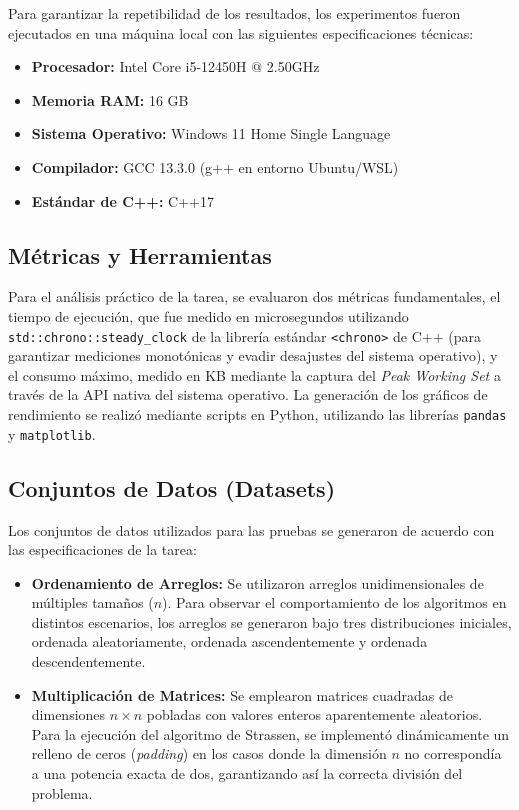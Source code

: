 Para garantizar la repetibilidad de los resultados, los experimentos fueron ejecutados en una máquina local con las siguientes especificaciones técnicas:

\begin{itemize}
    \item \textbf{Procesador:} Intel Core i5-12450H @ 2.50GHz
    \item \textbf{Memoria RAM:} 16 GB
    \item \textbf{Sistema Operativo:} Windows 11 Home Single Language
    \item \textbf{Compilador:} GCC 13.3.0 (g++ en entorno Ubuntu/WSL)
    \item \textbf{Estándar de C++:} C++17
\end{itemize}

\subsection*{Métricas y Herramientas}
Para el análisis práctico de la tarea, se evaluaron dos métricas fundamentales, el tiempo de ejecución, que fue medido en microsegundos utilizando \texttt{std::chrono::steady\_clock} de la librería estándar \texttt{<chrono>} de C++ (para garantizar mediciones monotónicas y evadir desajustes del sistema operativo), y el consumo máximo, medido en KB mediante la captura del \textit{Peak Working Set} a través de la API nativa del sistema operativo. La generación de los gráficos de rendimiento se realizó mediante scripts en Python, utilizando las librerías \texttt{pandas} y \texttt{matplotlib}.

\subsection*{Conjuntos de Datos (Datasets)}
Los conjuntos de datos utilizados para las pruebas se generaron de acuerdo con las especificaciones de la tarea:
\begin{itemize}
    \item \textbf{Ordenamiento de Arreglos:} Se utilizaron arreglos unidimensionales de múltiples tamaños ($n$). Para observar el comportamiento de los algoritmos en distintos escenarios, los arreglos se generaron bajo tres distribuciones iniciales, ordenada aleatoriamente, ordenada ascendentemente y ordenada descendentemente.
    \item \textbf{Multiplicación de Matrices:} Se emplearon matrices cuadradas de dimensiones $n \times n$ pobladas con valores enteros aparentemente aleatorios. Para la ejecución del algoritmo de Strassen, se implementó dinámicamente un relleno de ceros (\textit{padding}) en los casos donde la dimensión $n$ no correspondía a una potencia exacta de dos, garantizando así la correcta división del problema.
\end{itemize}